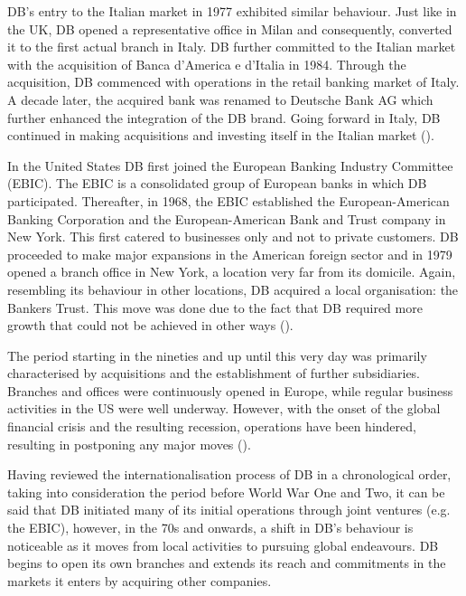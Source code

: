 \documentclass[11pt,a4paper]{article}
\begin{document}
{{DB's entry to the Italian market in 1977 exhibited similar behaviour. Just like in the UK, DB opened a representative office in Milan and consequently, converted it to the first actual branch in Italy. DB further committed to the Italian market with the acquisition of Banca d'America e d'Italia in 1984. Through the acquisition, DB commenced with operations in the retail banking market of Italy. A decade later, the acquired bank was renamed to Deutsche Bank AG which further enhanced the integration of the DB brand. %
Going forward in Italy, DB continued in making acquisitions and investing itself in the Italian market (\cite{deutschebankagDeutscheBankItaly}). \par
In the United States DB first joined the European Banking Industry Committee (EBIC). The EBIC is a consolidated group of European banks in which DB participated. Thereafter, in 1968, the EBIC established the European-American Banking Corporation and the European-American Bank and Trust company in New York. This first catered to businesses only and not to private customers. DB proceeded to make major expansions in the American foreign sector and in 1979 opened a branch office in New York, a location very far from its domicile. Again, resembling its behaviour in other locations, DB acquired a local organisation: the Bankers Trust. This move was done due to the fact that DB required more growth that could not be achieved in other ways (\cite{deutschebankagDeutscheBankUS}).   \par
The period starting in the nineties and up until this very day was primarily characterised by acquisitions and the establishment of further subsidiaries. Branches and offices were continuously opened in Europe, while regular business activities in the US were well underway. However, with the onset of the global financial crisis and the resulting recession, operations have been hindered, resulting in postponing any major moves (\cite{deutschebankagDeutscheBank1870}).  \par
Having reviewed the internationalisation process of DB in a chronological order, taking into consideration the period before World War One and Two, it can be said that DB initiated many of its initial operations through joint ventures (e.g. the EBIC), however, in the 70s and onwards, a shift in DB's behaviour is noticeable as it moves from local activities to pursuing global endeavours. DB begins to open its own branches and extends its reach and commitments in the markets it enters by acquiring other companies. \par
}}
\end{document}
